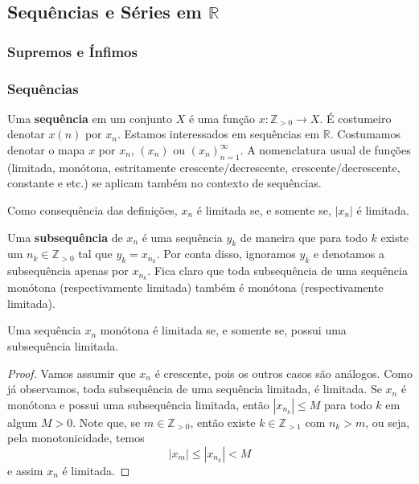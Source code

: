 \subsection{Sequências e Séries em \texorpdfstring{$\mathbb{R}$}{R}}

\subsubsection*{Supremos e Ínfimos}

\subsubsection*{Sequências}

Uma \textbf{sequência} em um conjunto $X$ é uma função $x \colon \mathbb{Z}_{>0} \to X$. É costumeiro denotar $x(n)$ por $x_n$. Estamos interessados em sequências em $\mathbb{R}$. Costumamos denotar o mapa $x$ por $x_n$, $(x_n)$ ou $(x_n)_{n = 1}^\infty$. A nomenclatura usual de funções (limitada, monótona, estritamente crescente/decrescente, crescente/decrescente, constante e etc.) se aplicam também no contexto de sequências.

\begin{corollary}
    Como consequência das definições, $x_n$ é limitada se, e somente se, $|x_n|$ é limitada.
\end{corollary}

Uma \textbf{subsequência} de $x_n$ é uma sequência $y_k$ de maneira que para todo $k$ existe um $n_k \in \mathbb{Z}_{>0}$ tal que $y_k = x_{n_k}$. Por conta disso, ignoramos $y_k$ e denotamos a subsequência apenas por $x_{n_k}$. Fica claro que toda subsequência de uma sequência monótona (respectivamente limitada) também é monótona (respectivamente limitada).

\begin{proposition}
    Uma sequência $x_n$ monótona é limitada se, e somente se, possui uma subsequência limitada.
\end{proposition}
\begin{proof}
    Vamos assumir que $x_n$ é crescente, pois os outros casos são análogos. Como já observamos, toda subsequência de uma sequência limitada, é limitada. Se $x_n$ é monótona e possui uma subsequência limitada, então $|x_{n_k}| \leq M$ para todo $k$ em algum $M > 0$. Note que, se $m \in \mathbb{Z}_{>0}$, então existe $k \in \mathbb{Z}_{>1}$ com $n_k > m$, ou seja, pela monotonicidade, temos \begin{equation}
        |x_m| \leq |x_{n_k}| < M
    \end{equation} e assim $x_n$ é limitada.
\end{proof}

